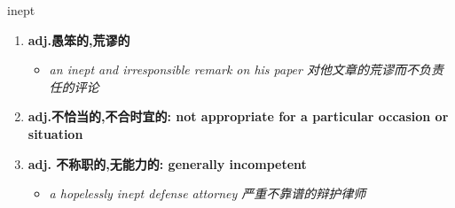 
\begin{frame}
{\huge inept}
\begin{center}
\begin{enumerate}\Large
  \item \textbf{adj.愚笨的,荒谬的}
  \begin{itemize}
    \item \em{\Large{an inept and irresponsible remark on his paper 对他文章的荒谬而不负责任的评论}}
  \end{itemize}
  \item \textbf{adj.不恰当的,不合时宜的: not appropriate for a particular occasion or situation}
  \item \textbf{adj. 不称职的,无能力的: generally incompetent}
  \begin{itemize}
    \item \em{\Large{a hopelessly inept defense attorney 严重不靠谱的辩护律师}}
  \end{itemize}
\end{enumerate}
\end{center}
\end{frame}
